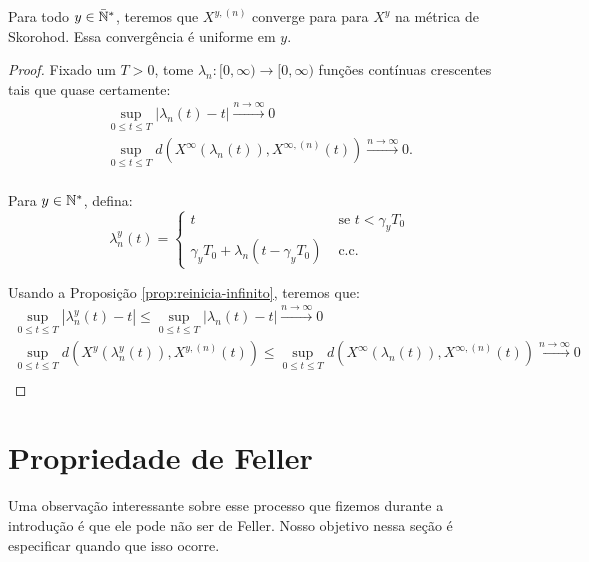 \begin{corolario}
  \label{cor:convergencia}
  Para todo $y \in {\mathbb{\bar{N}^*}}$, teremos que  $X^{y, (n)}$ converge \qc para
  para $X^y$ na métrica de Skorohod. Essa convergência é uniforme em
  $y$.
\end{corolario}
\begin{proof}
  Fixado um $T > 0$, tome $\lambda_n: [0, \infty) \to [0, \infty)$
  funções contínuas crescentes tais que quase certamente:
  \begin{gather*}
    \sup_{0 \leq t \leq T} |\lambda_n(t) - t|
    \xrightarrow{n\to\infty} 0 \\
    \sup_{0 \leq t \leq T} d(X^\infty(\lambda_n(t)), X^{\infty, (n)}(t))
    \xrightarrow{n\to\infty} 0. \\
  \end{gather*}

  Para $y \in {\mathbb{N^*}}$, defina:
  \begin{displaymath}
    \lambda_n^y(t) = \begin{cases}
      t & \textrm{ se } t < \gamma_y T_0\\
      \gamma_yT_0 + \lambda_n(t - \gamma_y T_0) & \textrm{ c.c.}
    \end{cases}
  \end{displaymath}

  Usando a Proposição \ref{prop:reinicia-infinito}, teremos que:
 \begin{gather*}
   \sup_{0 \leq t \leq T} |\lambda_n^y(t) - t| \leq
    \sup_{0 \leq t \leq T} |\lambda_n(t) - t|
    \xrightarrow{n\to\infty} 0 \\
    \sup_{0 \leq t \leq T} d(X^y(\lambda_n^y(t)), X^{y, (n)}(t)) \leq
    \sup_{0 \leq t \leq T} d(X^\infty(\lambda_n(t)), X^{\infty, (n)}(t))
    \xrightarrow{n\to\infty} 0 \\
  \end{gather*}
\end{proof}


\section{Propriedade de Feller}
\label{sec:prop-feller}


Uma observação interessante sobre esse processo que fizemos durante a
introdução é que ele pode não ser de Feller. Nosso objetivo nessa
seção é especificar quando que isso ocorre.

